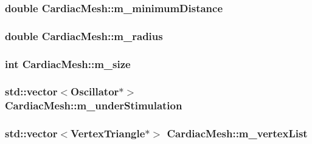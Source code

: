 \hypertarget{class_cardiac_mesh_a100654a6bb2237fc09cef29c517818ad}{
\subsubsection[{m\+\_\+minimum\+Distance}]{\setlength{\rightskip}{0pt plus 5cm}double Cardiac\+Mesh\+::m\+\_\+minimum\+Distance}}\label{class_cardiac_mesh_a100654a6bb2237fc09cef29c517818ad}
\hypertarget{class_cardiac_mesh_a4ebcb3d40ec7fbfea0b8f230a1677a00}{
\subsubsection[{m\+\_\+radius}]{\setlength{\rightskip}{0pt plus 5cm}double Cardiac\+Mesh\+::m\+\_\+radius}}\label{class_cardiac_mesh_a4ebcb3d40ec7fbfea0b8f230a1677a00}
\hypertarget{class_cardiac_mesh_aea33a4be0162859a292958757ac934fc}{
\subsubsection[{m\+\_\+size}]{\setlength{\rightskip}{0pt plus 5cm}int Cardiac\+Mesh\+::m\+\_\+size}}\label{class_cardiac_mesh_aea33a4be0162859a292958757ac934fc}
\hypertarget{class_cardiac_mesh_a21749f0b4af8fe59552f97058982f695}{
\subsubsection[{m\+\_\+under\+Stimulation}]{\setlength{\rightskip}{0pt plus 5cm}std\+::vector$<${\bf Oscillator}$\ast$$>$ Cardiac\+Mesh\+::m\+\_\+under\+Stimulation}}\label{class_cardiac_mesh_a21749f0b4af8fe59552f97058982f695}
\hypertarget{class_cardiac_mesh_a1961c25aa2da5493c0316d80c38cc088}{
\subsubsection[{m\+\_\+vertex\+List}]{\setlength{\rightskip}{0pt plus 5cm}std\+::vector$<${\bf Vertex\+Triangle}$\ast$$>$ Cardiac\+Mesh\+::m\+\_\+vertex\+List}}\label{class_cardiac_mesh_a1961c25aa2da5493c0316d80c38cc088}
